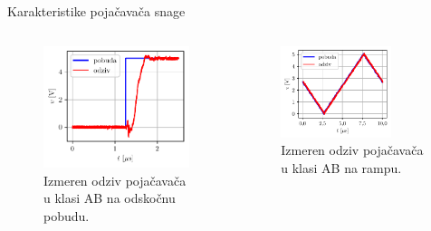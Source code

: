 \documentclass[aspectratio=169,xcolor=dvipsnames]{beamer}
\begin{document}

\begin{frame}{Karakteristike pojačavača snage}
	\begin{columns}[c]
    \begin{column}{.5\textwidth}
    \begin{figure}
        \centering
        \includegraphics[scale = 0.75]{fig/PAstep.pdf}
        \caption{Izmeren odziv pojačavača u klasi AB na odskočnu pobudu.}
    \end{figure}      
    \end{column}
    \begin{column}{.5\textwidth}
    \begin{figure}
        \centering
        \includegraphics[width=0.75\textwidth]{fig/PAramp.pdf}
        \caption{Izmeren odziv pojačavača u klasi AB na rampu.}
    \end{figure}
    \end{column}
\end{columns}
\end{frame}
\end{document}
